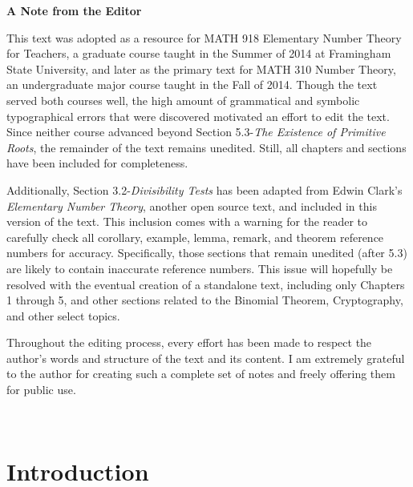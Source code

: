 \documentclass[12pt,letterpaper]{book}
\begin{document}
\begin{center}\textbf{A Note from the Editor}
\end{center}\par
This text was adopted as a resource for MATH 918 Elementary Number Theory for Teachers, a graduate course taught in the Summer of 2014 at Framingham State University, and later as the primary text for MATH 310 Number Theory, an undergraduate major course taught in the Fall of 2014.  Though the text served both courses well, the high amount of grammatical and symbolic typographical errors that were discovered motivated an effort to edit the text.  Since neither course advanced beyond Section 5.3-\textit{The Existence of Primitive Roots}, the remainder of the text remains unedited.  Still, all chapters and sections have been included for completeness.\par
Additionally, Section 3.2-\textit{Divisibility Tests} has been adapted from Edwin Clark's \textit{Elementary Number Theory}, another open source text, and included in this version of the text.  This inclusion comes with a warning for the reader to carefully check all corollary, example, lemma, remark, and theorem reference numbers for accuracy.  Specifically, those sections that remain unedited (after 5.3) are likely to contain inaccurate reference numbers.  This issue will hopefully be resolved with the eventual creation of a standalone text, including only Chapters 1 through 5, and other sections related to the Binomial Theorem, Cryptography, and other select topics.\par
Throughout the editing process, every effort has been made to respect the author's words and structure of the text and its content.  I am extremely grateful to the author for creating such a complete set of notes and freely offering them for public use.\par
~\par
\doclicenseThis

\maketitle  \tableofcontents

\chapter{Introduction}
\setcounter{page}{1}
\end{document}
